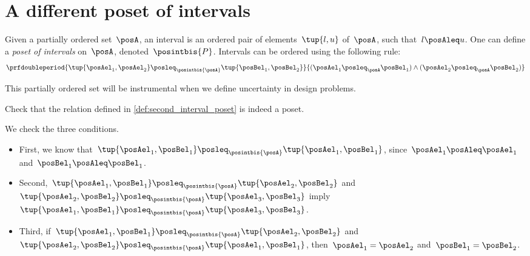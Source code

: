 
\section{A different poset of intervals}
\begin{definition}
    \label{def:second_interval_poset}
    Given a partially ordered set~$\posA$, an interval is an ordered pair of elements~$\tup{l,u}$ of~$\posA$, such that~$l\posAleq u$.
    One can define a \emph{poset of intervals} on~$\posA$, denoted~$\posintbis{P}$.
    Intervals can be ordered using the following rule:
    \begin{equation}
        \prfdoubleperiod{\tup{\posAel_1,\posAel_2}\posleq_{\posintbis{\posA}}\tup{\posBel_1,\posBel_2}}{(\posAel_1\posleq_\posA \posBel_1) \wedge (\posAel_2\posleq_\posA \posBel_2)}
    \end{equation}
\end{definition}

This partially ordered set will be instrumental when we define uncertainty in design problems.

\begin{exercise}
    Check that the relation defined in \cref{def:second_interval_poset} is indeed a poset.
\end{exercise}
\begin{solution}
    We check the three conditions.
    \begin{itemize}
        \item First, we know that~$\tup{\posAel_1,\posBel_1}\posleq_{\posintbis{\posA}}\tup{\posAel_1,\posBel_1}$, since~$\posAel_1\posAleq \posAel_1$ and~$\posBel_1\posAleq \posBel_1$.
        \item Second,~$\tup{\posAel_1,\posBel_1}\posleq_{\posintbis{\posA}}\tup{\posAel_2,\posBel_2}$ and~$\tup{\posAel_2,\posBel_2}\posleq_{\posintbis{\posA}}\tup{\posAel_3,\posBel_3}$ imply $\tup{\posAel_1,\posBel_1}\posleq_{\posintbis{\posA}}\tup{\posAel_3,\posBel_3}$.
        \item Third, if~$\tup{\posAel_1,\posBel_1}\posleq_{\posintbis{\posA}}\tup{\posAel_2,\posBel_2}$ and~$\tup{\posAel_2,\posBel_2}\posleq_{\posintbis{\posA}}\tup{\posAel_1,\posBel_1}$, then~$\posAel_1=\posAel_2$ and~$\posBel_1=\posBel_2$.
    \end{itemize}
\end{solution}
